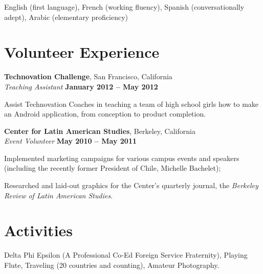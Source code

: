 \documentclass[margin,line]{resume}
\begin{document}
\begin{resume}
	English (first language), French (working fluency), Spanish (conversationally adept), 
	Arabic (elementary proficiency)

	\section{\mysidestyle Volunteer Experience}
	
	\textbf{Technovation Challenge}, San Francisco, California \vspace{1mm}\\\vspace{0mm}%
	\textsl{Teaching Assistant} \hfill \textbf{January 2012 -- May 2012}\vspace{0mm}\vspace{0mm}%
	\begin{list2}
		\item Assist Technovation Coaches in teaching a team of high school girls how to make an Android application, from conception to product completion.
	\end{list2}
	
	\newpage
	\textbf{Center for Latin American Studies}, Berkeley, California \vspace{1mm}\\\vspace{0mm}%
	\textsl{Event Volunteer} \hfill \textbf{May 2010 -- May 2011}\vspace{0mm}\vspace{0mm}%
	\begin{list2}
		\item Implemented marketing campaigns for various campus events and speakers (including the recently former President
	of Chile, Michelle Bachelet); 
		\item Researched and laid-out graphics for the Center's quarterly journal, the \emph{Berkeley Review of
	Latin American Studies}. 
	\end{list2}

	\section{\mysidestyle Activities}

	Delta Phi Epsilon (A Professional Co-Ed Foreign Service Fraternity), Playing Flute,
	Traveling (20 countries and counting), Amateur Photography.


\end{resume}
\end{document}
